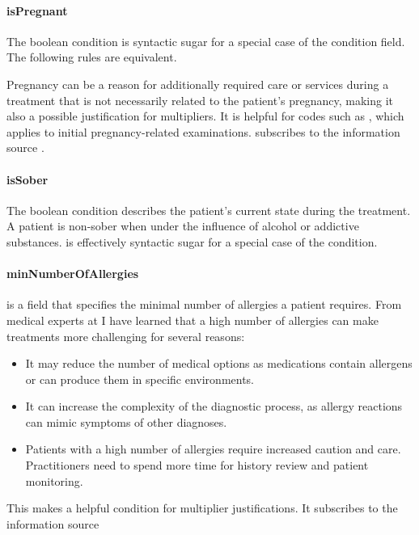 \paragraph{isPregnant}
The \isPregnant boolean condition is syntactic sugar for a special case of the \anamnesisBlocks condition field.
The following rules are equivalent.

Pregnancy can be a reason for additionally required care or services during a treatment that is not necessarily related to the patient's pregnancy,
making it also a possible justification for multipliers.
It is helpful for codes such as , which applies to initial pregnancy-related examinations.
 subscribes to the information source .

\paragraph{isSober}
The \isSober boolean condition describes the patient's current state during the treatment.
A patient is non-sober when under the influence of alcohol or addictive substances.
\isSober is effectively syntactic sugar for a special case of the \anamnesisBlocks condition.



\paragraph{minNumberOfAllergies}
\minNumberOfAllergies is a field that specifies the minimal number of allergies a patient requires.
From medical experts at \AV I have learned that a high number of allergies can make treatments more challenging for several reasons:
\begin{itemize}
    \item It may reduce the number of medical options as medications contain allergens or can produce them in specific environments.
    \item It can increase the complexity of the diagnostic process, as allergy reactions can mimic symptoms of other diagnoses.
    \item Patients with a high number of allergies require increased caution and care.
    Practitioners need to spend more time for history review and patient monitoring.
\end{itemize}
This makes \minNumberOfAllergies a helpful condition for multiplier justifications.
It subscribes to the information source 

